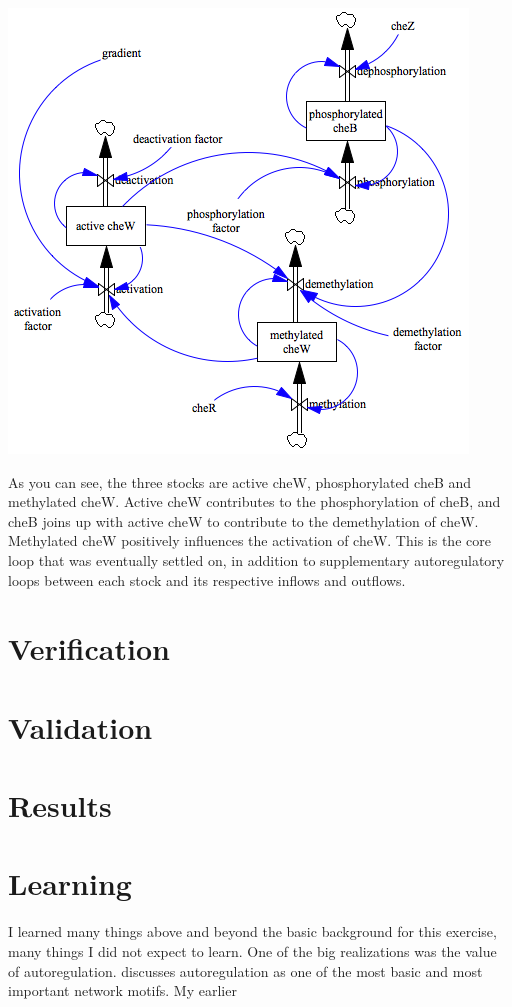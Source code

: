 \documentclass[12pt]{article}
\begin{document}
\includegraphics[scale=0.8]{autoregulation.png}

As you can see, the three stocks are active cheW, phosphorylated cheB and methylated cheW.  Active cheW contributes to the phosphorylation of cheB, and cheB joins up with active cheW to contribute to the demethylation of cheW.  Methylated cheW positively influences the activation of cheW.  This is the core loop that was eventually settled on, in addition to supplementary autoregulatory loops between each stock and its respective inflows and outflows.   

\section{Verification}



\section{Validation}



\section{Results}



\section{Learning}

I learned many things above and beyond the basic background for this exercise, many things I did not expect to learn.  One of the big realizations was the value of autoregulation.  \cite{Alon} discusses autoregulation as one of the most basic and most important network motifs.  My earlier





\end{document}
